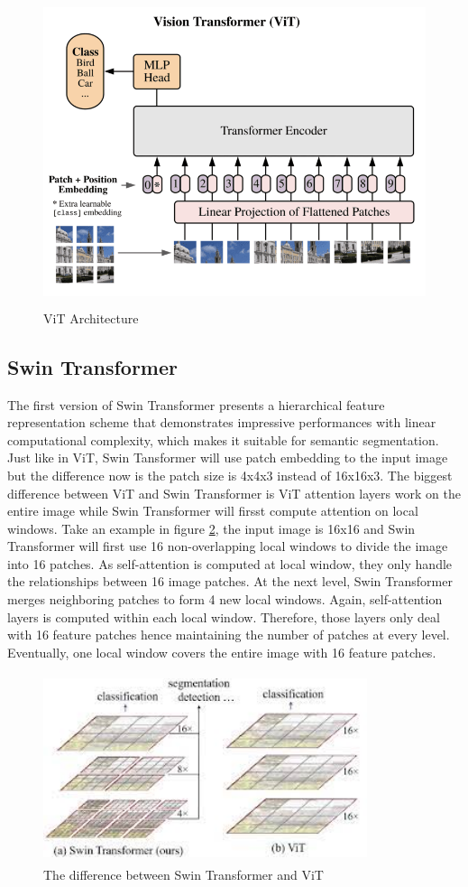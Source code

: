 \begin{figure}[ht]
\includegraphics[width=13.5cm, height=9cm]{images/vision transformer.png}
\centering
\caption{ViT Architecture}
\label{fig:vit}
\end{figure}

\subsection{Swin Transformer}
The first version of Swin Transformer \cite{swin-v1} presents a hierarchical feature representation scheme that demonstrates impressive performances with linear computational complexity, which makes it suitable for semantic segmentation. Just like in ViT, Swin Tansformer will use patch embedding to the input image but the difference now is the patch size is 4x4x3 instead of 16x16x3. The biggest difference between ViT and Swin Transformer is ViT attention layers work on the entire image while Swin Transformer will firsst compute attention on local windows. Take an example in figure \ref{fig:swin-vs-vit}, the input image is 16x16 and Swin Transformer will first use 16 non-overlapping local windows to divide the image into 16 patches. As self-attention is computed at local window, they only handle the relationships between 16 image patches. At the next level, Swin Transformer merges neighboring patches to form 4 new local windows. Again, self-attention layers is computed within each local window. Therefore, those layers only deal with 16 feature patches hence maintaining the number of patches at every level. Eventually, one local window covers the entire image with 16 feature patches.
\FloatBarrier
\begin{figure}[ht]
\includegraphics[width=9.5cm, height=5.5cm]{images/swin vs vit.png}
\centering
\caption{The difference between Swin Transformer and ViT}
\label{fig:swin-vs-vit}
\end{figure}

